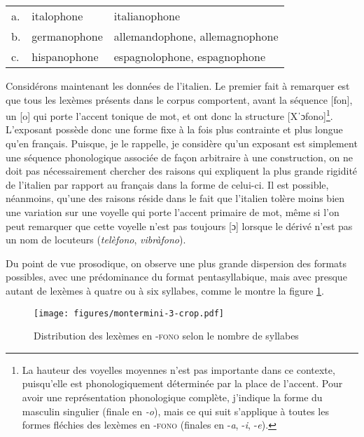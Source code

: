 \documentclass[output=paper]{langsci/langscibook}
\begin{document}
\ea\label{ex:montermini:8}
\begin{tabular}[t]{@{}lll}
a. & {italophone} & {italianophone}\\
b. & {germanophone} & {allemandophone}, {allemagnophone}\\
c. & {hispanophone} & {espagnolophone}, {espagnophone}\\
\end{tabular}
\z

Considérons maintenant les données de l'italien. Le premier fait à
remarquer est que tous les lexèmes présents dans le corpus comportent,
avant la séquence {[}fon{]}, un {[}o{]} qui porte l'accent tonique de
mot, et ont donc la structure {[}Xˈɔfono{]}\footnote{La hauteur des
  voyelles moyennes n'est pas importante dans ce contexte, puisqu'elle
  est phonologiquement déterminée par la place de l'accent. Pour avoir
  une représentation phonologique complète, j'indique la forme du
  masculin singulier (finale en \emph{-o}), mais ce qui suit s'applique
  à toutes les formes fléchies des lexèmes en \textsc{-fono} (finales en
  -\emph{a}, -\emph{i}, -\emph{e}).}. L'exposant possède donc une forme
fixe à la fois plus contrainte et plus longue qu'en français. Puisque,
je le rappelle, je considère qu'un exposant est simplement une séquence
phonologique associée de façon arbitraire à une construction, on ne doit
pas nécessairement chercher des raisons qui expliquent la plus grande
rigidité de l'italien par rapport au français dans la forme de celui-ci.
Il est possible, néanmoins, qu'une des raisons réside dans le fait que
l'italien tolère moins bien une variation sur une voyelle qui porte
l'accent primaire de mot, même si l'on peut remarquer que cette voyelle
n'est pas toujours {[}ɔ{]} lorsque le dérivé n'est pas un nom de
locuteurs (\emph{telèfono}, \emph{vibràfono}).

Du point de vue prosodique, on observe une plus grande dispersion des
formats possibles, avec une prédominance du format pentasyllabique, mais
avec presque autant de lexèmes à quatre ou à six syllabes, comme le montre la figure \ref{fig:Montermini:3}.

\begin{figure} 
{\texttt{[image: figures/montermini-3-crop.pdf]}}
\caption{Distribution des lexèmes en \textsc{-fono} selon le
nombre de syllabes}
\label{fig:Montermini:3}
\end{figure}
\end{document}
